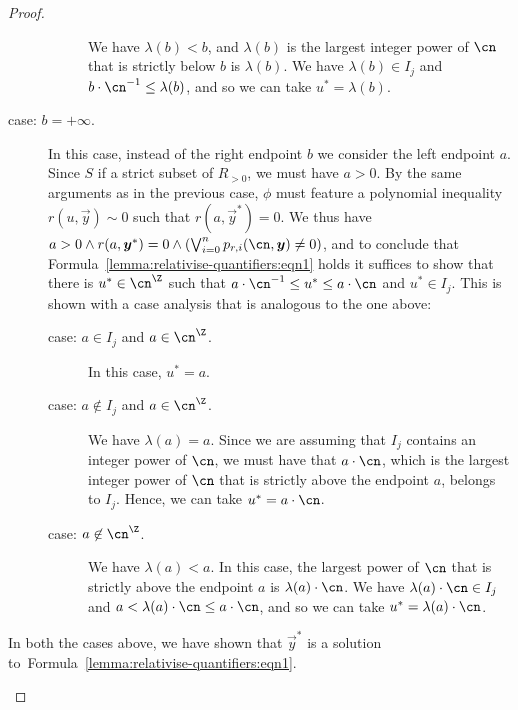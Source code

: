 \begin{proof}
\begin{claimproof}
\begin{description}
\begin{description}
            We have $\lambda(b) < b$, and $\lambda(b)$ is the largest integer
            power of $\cn$ that is strictly below $b$ is $\lambda(b)$. We have
            $\lambda(b) \in I_j$ and $b \cdot \cn^{-1} \leq \lambda(b)$, and so
            we can take $u^* = \lambda(b)$.
          \end{description}
        \item[case: $b = {+}\infty$.] 
        In this case, instead of the right endpoint $b$ we consider the left
        endpoint $a$. Since $S$ if a strict subset of $R_{> 0}$, we must have $a
        > 0$. By the same arguments as in the previous case, $\phi$ must feature
        a polynomial inequality $r(u,\vec y) \sim 0$ such that $r(a,\vec y^*) =
        0$. We thus have $a > 0 \land r(a,\vec y^*) = 0 \land (\bigvee_{i=0}^n
        p_{r,i}(\cn,\vec y) \neq 0)$, and to conclude that
        Formula~\eqref{lemma:relativise-quantifiers:eqn1} holds it suffices to
        show that there is $u^* \in \ipow{\cn}$ such that $a \cdot \cn^{-1} \leq
        u^* \leq a \cdot \cn$ and $u^* \in I_j$. This is shown with a case
        analysis that is analogous to the one above:
        \begin{description}
          \item[case: $a \in I_j$ and $a \in \ipow{\cn}$.] In this case, $u^* =
          a$.
          \item[case: $a \not\in I_j$ and $a \in \ipow{\cn}$.] We have
          $\lambda(a) = a$. Since we are assuming that $I_j$ contains an integer
          power of $\cn$, we must have that $a \cdot \cn$, which is the largest
          integer power of $\cn$ that is strictly above the endpoint $a$,
          belongs to $I_j$. Hence, we can take $u^* = a \cdot \cn$.
          \item[case: $a \not\in \ipow{\cn}$.]
          We have $\lambda(a) < a$. In this case, the largest power of $\cn$
          that is strictly above the endpoint $a$ is $\lambda(a) \cdot \cn$. We
          have $\lambda(a) \cdot \cn \in I_j$ and $a < \lambda(a) \cdot \cn \leq
          a \cdot \cn$, and so we can take $u^* = \lambda(a) \cdot \cn$.
        \end{description}
      \end{description}
      In both the cases above, we have shown that $\vec y^*$ 
      is a solution to~Formula~\eqref{lemma:relativise-quantifiers:eqn1}.
    \end{claimproof}
  

\end{proof}
